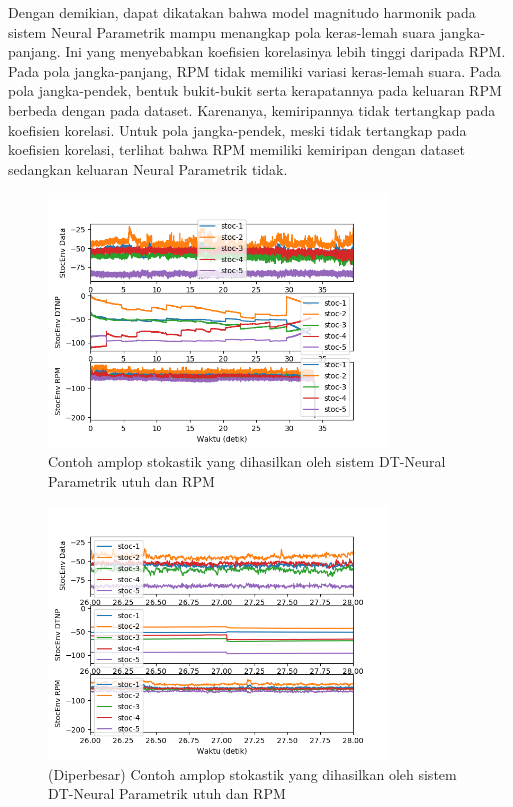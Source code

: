 Dengan demikian, dapat dikatakan bahwa model magnitudo harmonik pada sistem Neural Parametrik mampu menangkap pola keras-lemah suara jangka-panjang. Ini yang menyebabkan koefisien korelasinya lebih tinggi daripada RPM. Pada pola jangka-panjang, RPM tidak memiliki variasi keras-lemah suara. Pada pola jangka-pendek, bentuk bukit-bukit serta kerapatannya pada keluaran RPM berbeda dengan pada dataset. Karenanya, kemiripannya tidak tertangkap pada koefisien korelasi. Untuk pola jangka-pendek, meski tidak tertangkap pada koefisien korelasi, terlihat bahwa RPM memiliki kemiripan dengan dataset sedangkan keluaran Neural Parametrik tidak.

\begin{figure}[htbp]
    \centering
    \includegraphics[width=0.8\textwidth]{resources/Analisis_wholesystem_StocEnv.png}
    \caption{Contoh amplop stokastik yang dihasilkan oleh sistem DT-Neural Parametrik utuh dan RPM}\label{fig-wholesystem-stocenv-output-sample}
\end{figure}

\begin{figure}[htbp]
    \centering
    \includegraphics[width=0.8\textwidth]{resources/Analisis_wholesystem_StocEnv_zoomed.png}
    \caption{(Diperbesar) Contoh amplop stokastik yang dihasilkan oleh sistem DT-Neural Parametrik utuh dan RPM}\label{fig-wholesystem-stocenv-output-sample-zoomed}
\end{figure}

